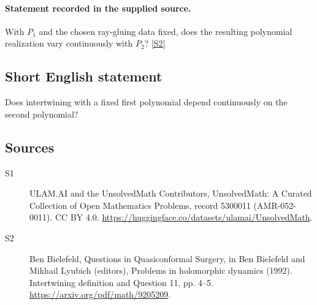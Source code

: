 \documentclass[11pt]{article}
\newcommand{\sref}[2]{\hyperlink{source:#1:#2}{[S#2]}}
\begin{document}
\paragraph{Statement recorded in the supplied source.}
With $P_1$ and the chosen ray-gluing data fixed, does the resulting polynomial realization vary continuously with $P_2$? \sref{5300011}{2}
\subsection{Short English statement}
Does intertwining with a fixed first polynomial depend continuously on the second polynomial?
\subsection{Sources}
\begin{description}
\item[\hypertarget{source:5300011:1}{S1}] ULAM.AI and the UnsolvedMath Contributors, UnsolvedMath: A Curated Collection of Open Mathematics Problems, record 5300011 (AMR-052-0011). CC BY 4.0. \url{https://huggingface.co/datasets/ulamai/UnsolvedMath}.
\item[\hypertarget{source:5300011:2}{S2}] Ben Bielefeld, Questions in Quasiconformal Surgery, in Ben Bielefeld and Mikhail Lyubich (editors), Problems in holomorphic dynamics (1992). Intertwining definition and Question 11, pp. 4–5. \url{https://arxiv.org/pdf/math/9205209}.
\end{description}
\label{end:5300011}
\end{document}
